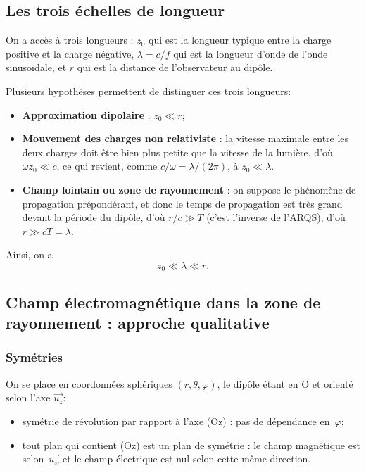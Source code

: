 \subsection{Les trois échelles de longueur}

On a accès à trois longueurs : $z_{0}$ qui est la longueur typique entre la charge positive et la charge négative, $\lambda=c/f$ qui est la longueur d'onde de l'onde sinusoïdale, et $r$ qui est la distance de l'observateur au dipôle.

Plusieurs hypothèses permettent de distinguer ces trois longueurs:
\begin{itemize}
    \item \textbf{Approximation dipolaire} : $z_{0}\ll r$;
    \item \textbf{Mouvement des charges non relativiste} : la vitesse maximale entre les deux charges doit être bien plus petite que la vitesse de la lumière, d'où $\omega z_{0}\ll c$, ce qui revient, comme $c/\omega = \lambda/(2\pi)$, à $z_{0}\ll\lambda$.
    \item \textbf{Champ lointain ou zone de rayonnement} : on suppose le phénomène de propagation prépondérant, et donc le temps de propagation est très grand devant la période du dipôle, d'où $r/c\gg T$ (c'est l'inverse de l'ARQS), d'où $r\gg cT=\lambda$.
\end{itemize}

Ainsi, on a
\begin{equation*}
    \boxed{
        z_{0}\ll \lambda\ll r.
    }
\end{equation*}

\subsection{Champ électromagnétique dans la zone de rayonnement : approche qualitative}

\subsubsection{Symétries}

On se place en coordonnées sphériques $(r,\theta,\varphi)$, le dipôle étant en O et orienté selon l'axe $\vec{u_z}$:
\begin{itemize}
    \item symétrie de révolution par rapport à l'axe (Oz) : pas de dépendance en~$\varphi$;
    \item tout plan qui contient (Oz) est un plan de symétrie : le champ magnétique est selon~$\vec{u_{\varphi}}$ et le champ électrique est nul selon cette même direction.
\end{itemize}

